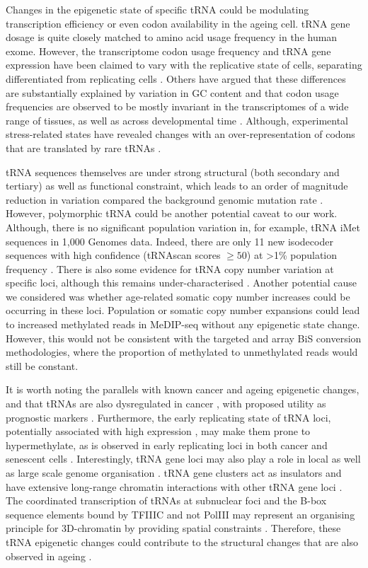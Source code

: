 \documentclass[
]{book}
\begin{document}
Changes in the epigenetic state of specific tRNA could be modulating transcription efficiency or even codon availability in the ageing cell.
tRNA gene dosage is quite closely matched to amino acid usage frequency in the human exome.
However, the transcriptome codon usage frequency and tRNA gene expression have been claimed to vary with the replicative state of cells, separating differentiated from replicating cells \citep{Gingold2014}.
Others have argued that these differences are substantially explained by variation in GC content \citep{Rudolph2016} and that codon usage frequencies are observed to be mostly invariant in the transcriptomes of a wide range of tissues, as well as across developmental time \citep{Schmitt2014}.
Although, experimental stress-related states have revealed changes with an over-representation of codons that are translated by rare tRNAs \citep{Gingold2012}.

tRNA sequences themselves are under strong structural (both secondary and tertiary) \citep{Goodenbour2006} as well as functional constraint, which leads to an order of magnitude reduction in variation compared the background genomic mutation rate \citep{Parisien2013}.
However, polymorphic tRNA could be another potential caveat to our work.
Although, there is no significant population variation in, for example, tRNA iMet sequences in 1,000 Genomes data.
Indeed, there are only 11 new isodecoder sequences with high confidence (tRNAscan scores \(\ge50\)) at \textgreater1\% population frequency \citep{Parisien2013}.
There is also some evidence for tRNA copy number variation at specific loci, although this remains under-characterised \citep{Iben2015, Darrow2014}.
Another potential cause we considered was whether age-related somatic copy number increases could be occurring in these loci.
Population or somatic copy number expansions could lead to increased methylated reads in MeDIP-seq without any epigenetic state change.
However, this would not be consistent with the targeted and array BiS conversion methodologies, where the proportion of methylated to unmethylated reads would still be constant.

It is worth noting the parallels with known cancer and ageing epigenetic changes, and that tRNAs are also dysregulated in cancer \citep{Huang2018}, with proposed utility as prognostic markers \citep{Krishnan2016}.
Furthermore, the early replicating state of tRNA loci, potentially associated with high expression \citep{Muller2017}, may make them prone to hypermethylate, as is observed in early replicating loci in both cancer \citep{Du2019} and senescent cells \citep{Cruickshanks2013}.
Interestingly, tRNA gene loci may also play a role in local as well as large scale genome organisation \citep[Hamdani2019;][]{VanBortle2017}.
tRNA gene clusters act as insulators \citep{Raab2011} and have extensive long-range chromatin interactions with other tRNA gene loci \citep{VanBortle2017}.
The coordinated transcription of tRNAs at subnuclear foci and the B-box sequence elements bound by TFIIIC and not PolIII may represent an organising principle for 3D-chromatin by providing spatial constraints \citep{Noma2006}.
Therefore, these tRNA epigenetic changes could contribute to the structural changes that are also observed in ageing \citep{Sun2018}.
\end{document}
